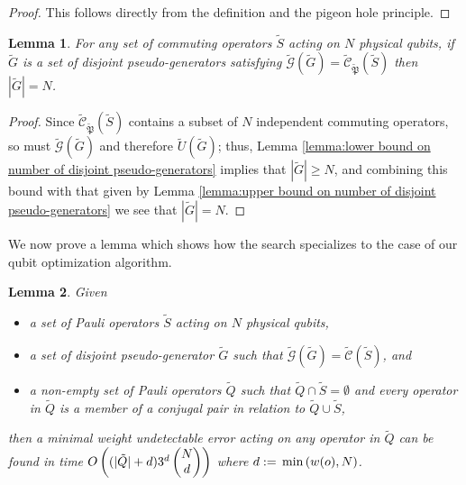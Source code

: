 \documentclass[twocolumn,showpacs,preprintnumbers,amsmath,amssymb,nofootinbib,pra,floatfix]{revtex4-1}
\newtheorem{lemma}{Lemma}
\newenvironment{remark}[1][Remark]{\begin{trivlist}
\item[\hskip \labelsep {\bfseries #1}]}{\end{trivlist}}
\newcommand{\set}{\tilde}
\newcommand{\genfun}{\tilde{\mathcal{G}}}
\newcommand{\pauligroup}{{\set{\mathfrak{P}}}}
\newcommand{\centralizer}{\set{\mathcal{C}}}
\begin{document}
\begin{proof}
This follows directly from the definition and the pigeon hole principle.
\end{proof}

\begin{lemma}
\label{lemma:exact bound on number of disjoint pseudo-generators}
For any set of commuting operators $\set S$ acting on $N$ physical qubits, if $\set G$ is a set of disjoint pseudo-generators satisfying $\genfun(\set G)=\centralizer_\pauligroup(\set S)$ then $|\set G|= N$.
\end{lemma}

\begin{proof}
Since $\centralizer_\pauligroup(\set S)$ contains a subset of $N$ independent commuting operators, so must $\genfun(\set G)$ and therefore $\set U(\set G)$;  thus, Lemma \ref{lemma:lower bound on number of disjoint pseudo-generators} implies that $|\set G|\ge N$, and combining this bound with that given by Lemma \ref{lemma:upper bound on number of disjoint pseudo-generators} we see that $|\set G|=N$.
\end{proof}
\begin{remark}
We now prove a lemma which shows how the search specializes to the case of our qubit optimization algorithm.
\end{remark}

\begin{lemma}
\label{lemma:search for minimal weight undetectable error}
Given
\begin{itemize}
\item a set of Pauli operators $\set S$ acting on $N$ physical qubits,
\item a set of disjoint pseudo-generator $\set G$ such that $\genfun(\set G)=\centralizer(\set S)$, and
\item a non-empty set of Pauli operators $\set Q$ such that $\set Q\cap\set S=\emptyset$ and every operator in $\set Q$ is a member of a conjugal pair in relation to $\set Q \cup \set S$,
\end{itemize}
then a minimal weight undetectable error acting on any operator in $\set Q$ can be found in time $O\paren{(|\set Q|+d)3^d\choose{N}{d}}$ where $d:=\,\text{min}\left(w(o),N\right)$.
\end{lemma}
\end{document}
